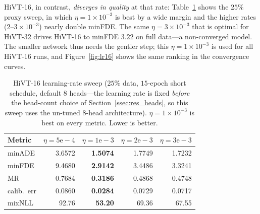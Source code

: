 HiVT-16, in contrast,
\emph{diverges in quality} at that rate: Table~\ref{tab:lr16} shows the $25\%$
proxy sweep, in which $\eta=1\times10^{-3}$ is best by a wide margin and the higher
rates ($2$--$3\times10^{-3}$) nearly double minFDE. The same $\eta=3\times10^{-3}$
that is optimal for HiVT-32 drives HiVT-16 to minFDE $3.22$ on full data---a
non-converged model. The smaller network thus needs the gentler step; this
$\eta=1\times10^{-3}$ is used for all HiVT-16 runs, and
Figure~\ref{fig:lr16} shows the same ranking in the convergence curves.

\begin{table}[htbp]
  \centering
  \caption{HiVT-16 learning-rate sweep ($25\%$ data, $15$-epoch short schedule,
    default $8$ heads---the learning rate is fixed \emph{before} the head-count
    choice of Section~\ref{ssec:res_heads}, so this sweep uses the un-tuned $8$-head
    architecture). $\eta=1\times10^{-3}$ is best on every metric. Lower is better.}
  \label{tab:lr16}
  \begin{tabular}{lrrrr}
    \toprule
    Metric & $\eta=5\mathrm{e}{-}4$ & $\eta=1\mathrm{e}{-}3$ & $\eta=2\mathrm{e}{-}3$ & $\eta=3\mathrm{e}{-}3$ \\
    \midrule
    minADE     & 3.6572 & \textbf{1.5074} & 1.7749 & 1.7232 \\
    minFDE     & 9.4680 & \textbf{2.9142} & 3.4486 & 3.3241 \\
    MR         & 0.7684 & \textbf{0.3186} & 0.4868 & 0.4748 \\
    calib.\ err& 0.0860 & \textbf{0.0284} & 0.0729 & 0.0717 \\
    mixNLL     & 92.76  & \textbf{53.20}  & 69.36  & 67.55  \\
    \bottomrule
  \end{tabular}
\end{table}

